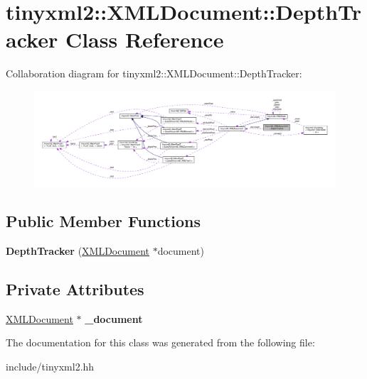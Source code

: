 \hypertarget{classtinyxml2_1_1XMLDocument_1_1DepthTracker}{}\section{tinyxml2\+:\+:X\+M\+L\+Document\+:\+:Depth\+Tracker Class Reference}
\label{classtinyxml2_1_1XMLDocument_1_1DepthTracker}


Collaboration diagram for tinyxml2\+:\+:X\+M\+L\+Document\+:\+:Depth\+Tracker\+:
\nopagebreak
\begin{figure}[H]
\begin{center}
\leavevmode
\includegraphics[width=350pt]{classtinyxml2_1_1XMLDocument_1_1DepthTracker__coll__graph}
\end{center}
\end{figure}
\subsection*{Public Member Functions}
\begin{DoxyCompactItemize}
\item 
{\bfseries Depth\+Tracker} (\hyperlink{classtinyxml2_1_1XMLDocument}{X\+M\+L\+Document} $\ast$document)\hypertarget{classtinyxml2_1_1XMLDocument_1_1DepthTracker_ac2782a163c2da773b84cb2c610b79bcb}{}\label{classtinyxml2_1_1XMLDocument_1_1DepthTracker_ac2782a163c2da773b84cb2c610b79bcb}

\end{DoxyCompactItemize}
\subsection*{Private Attributes}
\begin{DoxyCompactItemize}
\item 
\hyperlink{classtinyxml2_1_1XMLDocument}{X\+M\+L\+Document} $\ast$ {\bfseries \+\_\+document}\hypertarget{classtinyxml2_1_1XMLDocument_1_1DepthTracker_ab142a47709c83a3698af1470378b9385}{}\label{classtinyxml2_1_1XMLDocument_1_1DepthTracker_ab142a47709c83a3698af1470378b9385}

\end{DoxyCompactItemize}


The documentation for this class was generated from the following file\+:\begin{DoxyCompactItemize}
\item 
include/tinyxml2.\+hh\end{DoxyCompactItemize}
